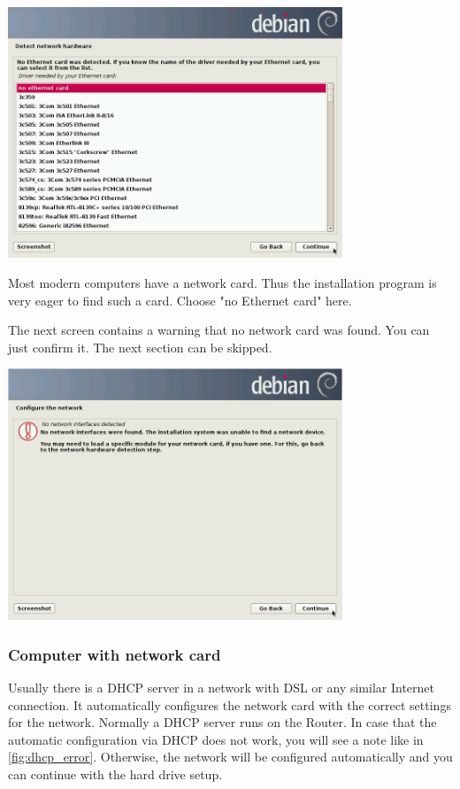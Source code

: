 \documentclass[a4paper,12pt,twoside]{article}
\begin{document}
\begin{minipage}{\linewidth}
  \centering
  \includegraphics[width=10cm]{efaLiveen-img/efaLiveen-img5.png}
  \label{fig:inst_netzwerkkarte}
\end{minipage}

Most modern computers have a network card. Thus the installation program
is very eager to find such a card. Choose "no Ethernet card" here.

The next screen contains a warning that no network card was found. You can
just confirm it. The next section can be skipped.

\begin{minipage}{\linewidth}
  \centering
  \includegraphics[width=10cm]{efaLiveen-img/efaLiveen-img6.png}
  \label{fig:inst_conf_net}
\end{minipage}


\subsubsection{Computer with network card}
\label{sct:inst_with_net}
Usually there is a DHCP server in a network with DSL or any similar
Internet connection. It automatically configures the network card with
the correct settings for the network. Normally a DHCP server runs on
the Router. In case that the automatic configuration via DHCP does not
work, you will see a note like in \ref{fig:dhcp_error}. Otherwise, the
network will be configured automatically and you can continue with the
hard drive setup.
\end{document}

